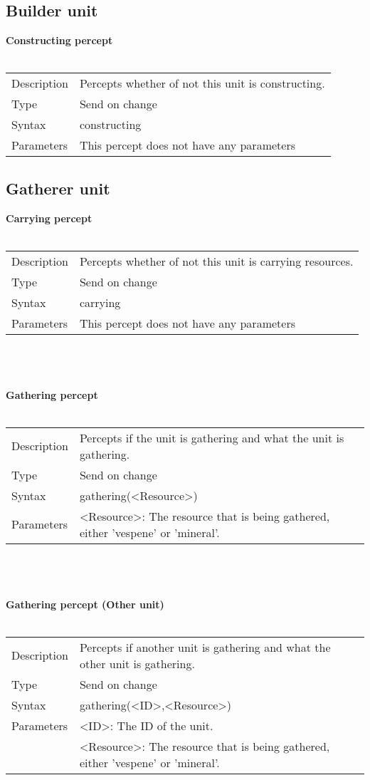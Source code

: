 \documentclass[english,11pt]{report}
\begin{document}
\subsection{Builder unit}
\textbf{Constructing percept}\\
\\
\begin{tabularx}{\textwidth}{lX}
 Description & Percepts whether of not this unit is constructing. \\
 Type & Send on change \\
 Syntax & constructing \\
 Parameters &   This percept does not have any parameters
\end{tabularx}

\subsection{Gatherer unit}
\textbf{Carrying percept}\\
\\
\begin{tabularx}{\textwidth}{lX}
 Description & Percepts whether of not this unit is carrying resources. \\
 Type & Send on change \\
 Syntax & carrying \\
 Parameters &   This percept does not have any parameters
\end{tabularx}\\
\\
\\
\textbf{Gathering percept}\\
\\
\begin{tabularx}{\textwidth}{lX}
 Description & Percepts if the unit is gathering and what the unit is gathering. \\
 Type & Send on change \\
 Syntax & gathering(<Resource>) \\
 Parameters &   <Resource>: The resource that is being gathered, either 'vespene' or 'mineral'.
\end{tabularx}\\
\\
\\
\textbf{Gathering percept (Other unit)}\\
\\
\begin{tabularx}{\textwidth}{lX}
 Description & Percepts if another unit is gathering and what the other unit is gathering. \\
 Type & Send on change \\
 Syntax & gathering(<ID>,<Resource>) \\
 Parameters &   <ID>: The ID of the unit.\\
            &   <Resource>: The resource that is being gathered, either 'vespene' or 'mineral'.
\end{tabularx}\\
\end{document}
